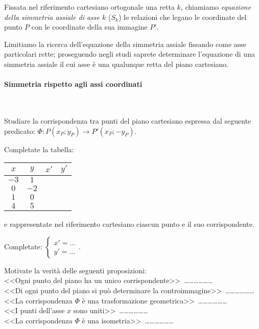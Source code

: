 \begin{definizione}
Fissata nel riferimento cartesiano ortogonale una retta $k$, chiamiamo \emph{equazione della simmetria assiale di asse $k$} ($S_k$) le relazioni che legano le coordinate del punto $P$ con le coordinate della sua immagine $P'$.
\end{definizione}

Limitiamo la ricerca dell'equazione della simmetria assiale fissando come asse particolari rette; proseguendo negli studi saprete determinare l'equazione di una simmetria assiale il cui asse è una qualunque retta del piano cartesiano.

\paragraph{Simmetria rispetto agli assi coordinati}
~

\begin{exrig}
\begin{esempio}
Studiare la corrispondenza tra punti del piano cartesiano espressa dal seguente predicato: $\Phi:P(x_P;y_P) \rightarrow P'(x_P;-y_P)$.\vspace{7pt}

Completate la tabella: 
\begin{center}
\begin{tabular}{cccc}
\toprule
$x$ & $y$ & $x'$ & $y'$\\
\midrule
$-3$ & $1$ &  &  \\
$0$ & $-2$ &  &  \\
$1$ & $0$ & &  \\
$4$ & $5$ & &  \\
\bottomrule
\end{tabular}
\end{center}

\noindent e rappresentate nel riferimento cartesiano ciascun punto e il suo corrispondente.

Completate: $\begin{cases}x'=\ldots{} \\ y'=\ldots{}\end{cases}$.

Motivate la verità delle seguenti proposizioni:\\
<<Ogni punto del piano ha un unico corrispondente>>~\ldots\ldots\ldots\ldots\ldots\ldots{}\\
<<Di ogni punto del piano si può determinare la controimmagine>>~\ldots\ldots\ldots\ldots\ldots\ldots{}\\
<<La corrispondenza $\Phi$ è una trasformazione geometrica>>~\ldots\ldots\ldots\ldots\ldots\ldots{}\\
<<I punti dell'asse $x$ sono uniti>>~\ldots\ldots\ldots\ldots\ldots\ldots{}\\
<<La corrispondenza $\Phi$ è una isometria>>~\ldots\ldots\ldots\ldots\ldots\ldots{}
\end{esempio}
\end{exrig}

